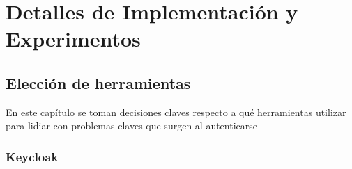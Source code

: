 \chapter{Detalles de Implementación y Experimentos}\label{chapter:implementation}

\section*{Elección de herramientas}
En este capítulo se toman decisiones claves respecto a qué herramientas utilizar para lidiar con problemas claves que surgen al autenticarse

%
%


\subsection{Keycloak}

